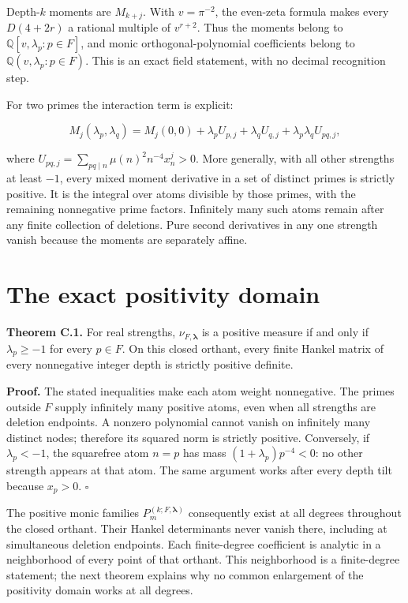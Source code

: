 Depth-\(k\) moments are \(M_{k+j}\). With \(v=\pi^{-2}\), the even-zeta
formula makes every \(D(4+2r)\) a rational multiple of \(v^{r+2}\). Thus
the moments belong to \(\mathbb Q[v,\lambda_p:p\in F]\), and monic
orthogonal-polynomial coefficients belong to
\(\mathbb Q(v,\lambda_p:p\in F)\). This is an exact field statement,
with no decimal recognition step.

For two primes the interaction term is explicit:

\[
M_j(\lambda_p,\lambda_q)=M_j(0,0)+\lambda_p U_{p,j}
+\lambda_q U_{q,j}+\lambda_p\lambda_q U_{pq,j},
\]

where \(U_{pq,j}=\sum_{pq\mid n}\mu(n)^2n^{-4}x_n^j>0\). More generally,
with all other strengths at least \(-1\), every mixed moment derivative
in a set of distinct primes is strictly positive. It is the integral
over atoms divisible by those primes, with the remaining nonnegative
prime factors. Infinitely many such atoms remain after any finite
collection of deletions. Pure second derivatives in any one strength
vanish because the moments are separately affine.

\hypertarget{the-exact-positivity-domain}{%
\section{The exact positivity
domain}\label{the-exact-positivity-domain}}

\textbf{Theorem C.1.} For real strengths, \(\nu_{F,\boldsymbol\lambda}\)
is a positive measure if and only if \(\lambda_p\ge-1\) for every
\(p\in F\). On this closed orthant, every finite Hankel matrix of every
nonnegative integer depth is strictly positive definite.

\textbf{Proof.} The stated inequalities make each atom weight
nonnegative. The primes outside \(F\) supply infinitely many positive
atoms, even when all strengths are deletion endpoints. A nonzero
polynomial cannot vanish on infinitely many distinct nodes; therefore
its squared norm is strictly positive. Conversely, if \(\lambda_p<-1\),
the squarefree atom \(n=p\) has mass \((1+\lambda_p)p^{-4}<0\): no other
strength appears at that atom. The same argument works after every depth
tilt because \(x_p>0\). \(\square\)

The positive monic families \(P_m^{(k;F,\boldsymbol\lambda)}\)
consequently exist at all degrees throughout the closed orthant. Their
Hankel determinants never vanish there, including at simultaneous
deletion endpoints. Each finite-degree coefficient is analytic in a
neighborhood of every point of that orthant. This neighborhood is a
finite-degree statement; the next theorem explains why no common
enlargement of the positivity domain works at all degrees.

